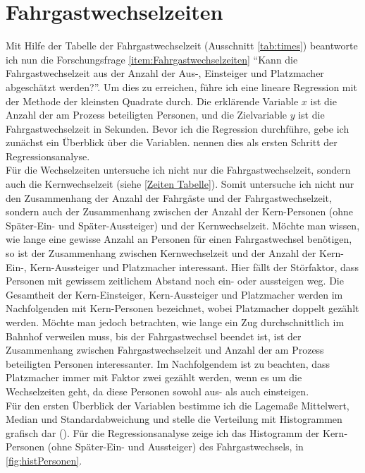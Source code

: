 \section{Fahrgastwechselzeiten} \label{Zeiten}
Mit Hilfe der Tabelle der Fahrgastwechselzeit (Ausschnitt \tablename \ref{tab:times}) beantworte ich nun die Forschungsfrage \ref{item:Fahrgastwechselzeiten} "`Kann die Fahrgastwechselzeit aus der Anzahl der Aus-, Einsteiger und Platzmacher abgeschätzt werden?"'. Um dies zu erreichen, führe ich eine lineare Regression mit der Methode der kleinsten Quadrate durch. Die erklärende Variable $x$ ist die Anzahl der am Prozess beteiligten Personen, und die Zielvariable $y$ ist die Fahrgastwechselzeit in Sekunden. Bevor ich die Regression durchführe, gebe ich zunächst ein Überblick über die Variablen. \cite{Fahrmeir.2009} nennen dies als ersten Schritt der Regressionsanalyse. \\
Für die Wechselzeiten untersuche ich nicht nur die Fahrgastwechselzeit, sondern auch die Kernwechselzeit (siehe \ref{Zeiten Tabelle}). Somit untersuche ich nicht nur den Zusammenhang der Anzahl der Fahrgäste und der Fahrgastwechselzeit, sondern auch der Zusammenhang zwischen der Anzahl der Kern-Personen (ohne Später-Ein- und Später-Aussteiger) und der Kernwechselzeit. Möchte man wissen, wie lange eine gewisse Anzahl an Personen für einen Fahrgastwechsel benötigen, so ist der Zusammenhang zwischen Kernwechselzeit und der Anzahl der Kern-Ein-, Kern-Aussteiger und Platzmacher interessant. Hier fällt der Störfaktor, dass Personen mit gewissem zeitlichem Abstand noch ein- oder aussteigen weg. Die Gesamtheit der Kern-Einsteiger, Kern-Aussteiger und Platzmacher werden im Nachfolgenden mit Kern-Personen bezeichnet, wobei Platzmacher doppelt gezählt werden. Möchte man jedoch betrachten, wie lange ein Zug durchschnittlich im Bahnhof verweilen muss, bis der Fahrgastwechsel beendet ist, ist der Zusammenhang zwischen Fahrgastwechselzeit und Anzahl der am Prozess beteiligten Personen interessanter. Im Nachfolgendem ist zu beachten, dass Platzmacher immer mit Faktor zwei gezählt werden, wenn es um die Wechselzeiten geht, da diese Personen sowohl aus- als auch einsteigen.\\ 
Für den ersten Überblick der Variablen bestimme ich die Lagemaße Mittelwert, Median und Standardabweichung und stelle die Verteilung mit Histogrammen grafisch dar (\cite{Fahrmeir.2009}). Für die Regressionsanalyse zeige ich das Histogramm der Kern-Personen (ohne Später-Ein- und Aussteiger) des Fahrgastwechsels, in \figurename \ref{fig:histPersonen}.
